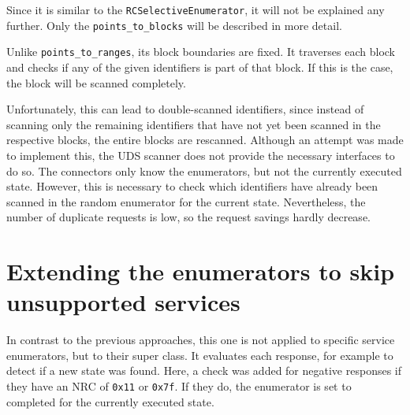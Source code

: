 Since it is similar to the \texttt{RCSelectiveEnumerator}, it will not be explained any further. Only the \texttt{points_to_blocks} will be described in more detail.


Unlike \texttt{points_to_ranges}, its block boundaries are fixed. It traverses each block and checks if any of the given identifiers is part of that block. If this is the case, the block will be scanned completely.

Unfortunately, this can lead to double-scanned identifiers, since instead of scanning only the remaining identifiers that have not yet been scanned in the respective blocks, the entire blocks are rescanned. Although an attempt was made to implement this, the UDS scanner does not provide the necessary interfaces to do so. The connectors only know the enumerators, but not the currently executed state. However, this is necessary to check which identifiers have already been scanned in the random enumerator for the current state. Nevertheless, the number of duplicate requests is low, so the request savings hardly decrease.

\section{Extending the enumerators to skip unsupported services}

In contrast to the previous approaches, this one is not applied to specific service enumerators, but to their super class. It evaluates each response, for example to detect if a new state was found. Here, a check was added for negative responses if they have an NRC of \texttt{0x11} or \texttt{0x7f}. If they do, the enumerator is set to completed for the currently executed state.

